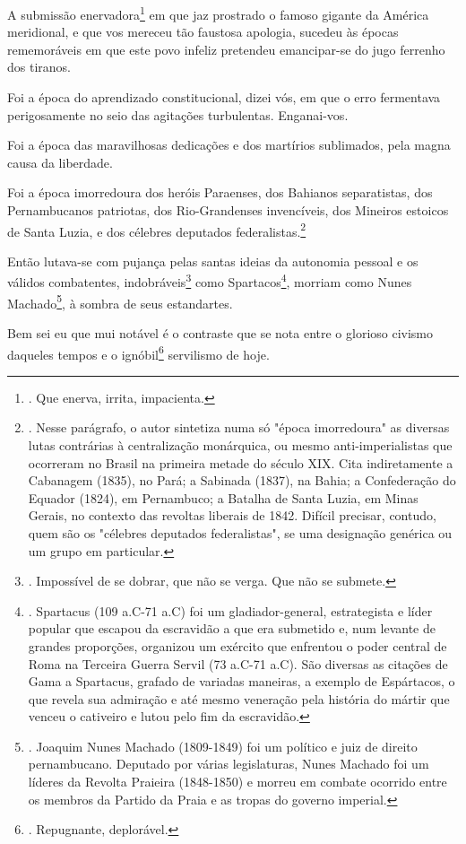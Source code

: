 A submissão enervadora\footnote{. Que enerva, irrita, impacienta.} em
que jaz prostrado o famoso gigante da América meridional, e que vos
mereceu tão faustosa apologia, sucedeu às épocas rememoráveis em que
este povo infeliz pretendeu emancipar-se do jugo ferrenho dos tiranos.

Foi a época do aprendizado constitucional, dizei vós, em que o erro
fermentava perigosamente no seio das agitações turbulentas. Enganai-vos.

Foi a época das maravilhosas dedicações e dos martírios sublimados, pela
magna causa da liberdade.

Foi a época imorredoura dos heróis Paraenses, dos Bahianos separatistas,
dos Pernambucanos patriotas, dos Rio-Grandenses invencíveis, dos
Mineiros estoicos de Santa Luzia, e dos célebres deputados
federalistas.\footnote{. Nesse parágrafo, o autor sintetiza numa só
  "época imorredoura" as diversas lutas contrárias à centralização
  monárquica, ou mesmo anti-imperialistas que ocorreram no Brasil na
  primeira metade do século XIX. Cita indiretamente a Cabanagem (1835),
  no Pará; a Sabinada (1837), na Bahia; a Confederação do Equador
  (1824), em Pernambuco; a Batalha de Santa Luzia, em Minas Gerais, no
  contexto das revoltas liberais de 1842. Difícil precisar, contudo,
  quem são os "célebres deputados federalistas", se uma designação
  genérica ou um grupo em particular.}

Então lutava-se com pujança pelas santas ideias da autonomia pessoal e
os válidos combatentes, indobráveis\footnote{. Impossível de se dobrar,
  que não se verga. Que não se submete.} como Spartacos\footnote{.
  Spartacus (109 a.C-71 a.C) foi um gladiador-general, estrategista e
  líder popular que escapou da escravidão a que era submetido e, num
  levante de grandes proporções, organizou um exército que enfrentou o
  poder central de Roma na Terceira Guerra Servil (73 a.C-71 a.C). São
  diversas as citações de Gama a Spartacus, grafado de variadas
  maneiras, a exemplo de Espártacos, o que revela sua admiração e até
  mesmo veneração pela história do mártir que venceu o cativeiro e lutou
  pelo fim da escravidão.}, morriam como Nunes Machado\footnote{.
  Joaquim Nunes Machado (1809-1849) foi um político e juiz de direito
  pernambucano. Deputado por várias legislaturas, Nunes Machado foi um
  líderes da Revolta Praieira (1848-1850) e morreu em combate ocorrido
  entre os membros da Partido da Praia e as tropas do governo imperial.},
à sombra de seus estandartes.

Bem sei eu que mui notável é o contraste que se nota entre o glorioso
civismo daqueles tempos e o ignóbil\footnote{. Repugnante, deplorável.}
servilismo de hoje.

